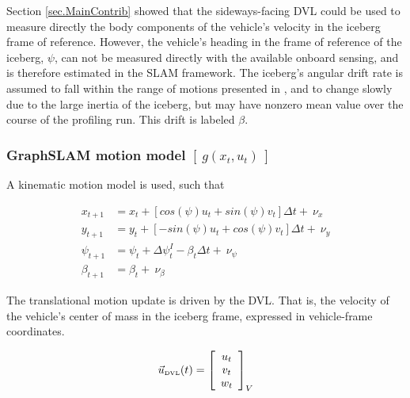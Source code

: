 
Section \ref{sec.MainContrib} showed that the sideways-facing DVL could be used to measure directly the body components of the vehicle's velocity in the iceberg frame of reference. However, the vehicle's heading in the frame of reference of the iceberg, $\psi$, can not be measured directly with the available onboard sensing, and is therefore estimated in the SLAM framework. The iceberg's angular drift rate is assumed to fall within the range of motions presented in  \cite{Gladstone2002,Wadhams1983}, and to change slowly due to the large inertia of the iceberg, but may have nonzero mean value over the course of the profiling run. This drift is labeled $\beta$. 

\subsubsection{GraphSLAM motion model $\left[~g\left(x_t,u_t\right)~\right]$ }

A kinematic motion model is used, such that

\begin{align}
x_{t+1} &= x_t + \left[cos(\psi) u_t + sin(\psi)v_t\right]\Delta t +~ \nu_x\\
y_{t+1} &= y_t + \left[-sin(\psi) u_t + cos(\psi)v_t\right]\Delta t + ~\nu_y \\
\psi_{t+1}    &= \psi_{t} + \Delta\psi_t^I - \beta_t\Delta t + ~\nu_\psi \\
\beta_{t +1}   &= \beta_{t} + ~\nu_\beta
\end{align}


The translational motion update is driven by the DVL. That is, the velocity of the vehicle's center of mass in the iceberg frame, expressed in vehicle-frame coordinates. 

\begin{equation}
\vec{u}_\text{\tiny{DVL}}(t) = 
                    \left[\begin{array}{c}
                     u_t \\ v_t \\ w_t 
                     \end{array}\right]_V
\end{equation}

